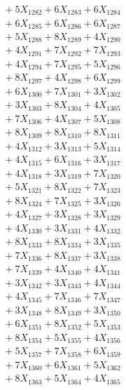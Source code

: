 \documentclass[a4paper,10pt]{article}
\begin{document}
{\begin{align}
&\;  + 5 X_{1282} + 6 X_{1283} + 6 X_{1284} \\[0.3ex]
&\;  + 6 X_{1285} + 6 X_{1286} + 6 X_{1287} \\[0.3ex]
&\;  + 5 X_{1288} + 8 X_{1289} + 4 X_{1290} \\[0.3ex]
&\;  + 4 X_{1291} + 7 X_{1292} + 7 X_{1293} \\[0.3ex]
&\;  + 4 X_{1294} + 7 X_{1295} + 5 X_{1296} \\[0.3ex]
&\;  + 8 X_{1297} + 4 X_{1298} + 6 X_{1299} \\[0.5ex]\allowbreak
&\;  + 6 X_{1300} + 7 X_{1301} + 3 X_{1302} \\[0.3ex]
&\;  + 3 X_{1303} + 8 X_{1304} + 4 X_{1305} \\[0.3ex]
&\;  + 7 X_{1306} + 4 X_{1307} + 5 X_{1308} \\[0.3ex]
&\;  + 8 X_{1309} + 8 X_{1310} + 8 X_{1311} \\[0.3ex]
&\;  + 4 X_{1312} + 3 X_{1313} + 5 X_{1314} \\[0.3ex]
&\;  + 4 X_{1315} + 6 X_{1316} + 3 X_{1317} \\[0.3ex]
&\;  + 4 X_{1318} + 3 X_{1319} + 7 X_{1320} \\[0.3ex]
&\;  + 5 X_{1321} + 8 X_{1322} + 7 X_{1323} \\[0.3ex]
&\;  + 8 X_{1324} + 7 X_{1325} + 3 X_{1326} \\[0.3ex]
&\;  + 4 X_{1327} + 3 X_{1328} + 3 X_{1329} \\[0.5ex]\allowbreak
&\;  + 4 X_{1330} + 3 X_{1331} + 4 X_{1332} \\[0.3ex]
&\;  + 8 X_{1333} + 8 X_{1334} + 3 X_{1335} \\[0.3ex]
&\;  + 7 X_{1336} + 8 X_{1337} + 3 X_{1338} \\[0.3ex]
&\;  + 7 X_{1339} + 4 X_{1340} + 4 X_{1341} \\[0.3ex]
&\;  + 3 X_{1342} + 3 X_{1343} + 4 X_{1344} \\[0.3ex]
&\;  + 4 X_{1345} + 7 X_{1346} + 7 X_{1347} \\[0.3ex]
&\;  + 3 X_{1348} + 8 X_{1349} + 3 X_{1350} \\[0.3ex]
&\;  + 6 X_{1351} + 8 X_{1352} + 5 X_{1353} \\[0.3ex]
&\;  + 8 X_{1354} + 5 X_{1355} + 4 X_{1356} \\[0.3ex]
&\;  + 5 X_{1357} + 7 X_{1358} + 6 X_{1359} \\[0.5ex]\allowbreak
&\;  + 7 X_{1360} + 6 X_{1361} + 5 X_{1362} \\[0.3ex]
&\;  + 8 X_{1363} + 5 X_{1364} + 4 X_{1365} \\[0.3ex]

\end{align}}
\end{document}
